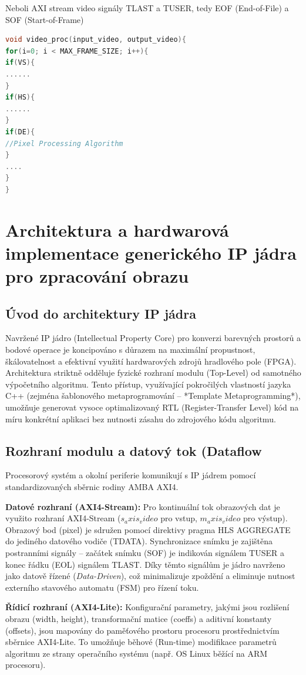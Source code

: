 \documentclass[FM,DP]{tulthesis}
\begin{document}
Neboli AXI stream video signály TLAST a TUSER, tedy EOF (End-of-File) a SOF
(Start-of-Frame)
\begin{lstlisting}[language=C]
void video_proc(input_video, output_video){
for(i=0; i < MAX_FRAME_SIZE; i++){
if(VS){
......
}
if(HS){
......
}
if(DE){
//Pixel Processing Algorithm
}
....
}
}
\end{lstlisting}

\section{Architektura a hardwarová implementace generického IP jádra pro zpracování obrazu}

\subsection{Úvod do architektury IP jádra}
Navržené IP jádro (Intellectual Property Core) pro konverzi barevných prostorů
a bodové operace je koncipováno s důrazem na maximální propustnost,
škálovatelnost a efektivní využití hardwarových zdrojů hradlového pole (FPGA).
Architektura striktně odděluje fyzické rozhraní modulu (Top-Level) od samotného
výpočetního algoritmu. Tento přístup, využívající pokročilých vlastností jazyka
C++ (zejména šablonového metaprogramování – *Template Metaprogramming*),
umožňuje generovat vysoce optimalizovaný RTL (Register-Transfer Level) kód na
míru konkrétní aplikaci bez nutnosti zásahu do zdrojového kódu algoritmu.

\subsection{Rozhraní modulu a datový tok (Dataflow}
Procesorový systém a okolní periferie komunikují s IP jádrem pomocí
standardizovaných sběrnic rodiny AMBA AXI4.

\textbf{Datové rozhraní (AXI4-Stream):} Pro kontinuální tok obrazových dat je využito rozhraní AXI4-Stream ($s_axis_video$ pro vstup, $m_axis_video$ pro výstup). Obrazový bod (pixel) je sdružen pomocí direktivy pragma HLS AGGREGATE do jediného datového vodiče (TDATA). Synchronizace snímku je zajištěna postranními signály – začátek snímku (SOF) je indikován signálem TUSER a konec řádku (EOL) signálem TLAST. Díky těmto signálům je jádro navrženo jako datově řízené (\textit{Data-Driven}), což minimalizuje zpoždění a eliminuje nutnost externího stavového automatu (FSM) pro řízení toku.

\textbf{Řídicí rozhraní (AXI4-Lite):} Konfigurační parametry, jakými jsou rozlišení obrazu (width, height), transformační matice (coeffs) a aditivní konstanty (offsets), jsou mapovány do paměťového prostoru procesoru prostřednictvím sběrnice AXI4-Lite. To umožňuje běhové (Run-time) modifikace parametrů algoritmu ze strany operačního systému (např. OS Linux běžící na ARM procesoru).
\end{document}
